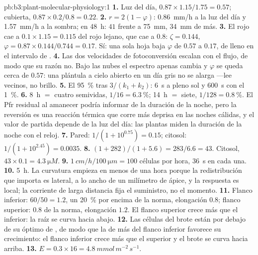\begin{solution}{pb:b3:plant-molecular-physiology:1}
\textbf{1.} Luz del día, $0.87\times 1.15/1.75 = 0.57$; cubierta, $0.87\times
0.2/0.8 = 0.22$.
\textbf{2.} $r = 2(1 - \varphi)$: \qty{0.86}{mm/h} a la luz del día y
\qty{1.57}{mm/h} a la sombra; en \qty{48}{h}: $41$ frente a
\qty{75}{mm}, \qty{34}{mm} de más.
\textbf{3.} El rojo cae a $0.1\times 1.15 = 0.115$ del rojo lejano, que
cae a $0.8$: $\zeta = 0.144$, $\varphi = 0.87\times 0.144/0.744 =
0.17$. Sí: una sola hoja baja $\varphi$ de $0.57$ a $0.17$, de lleno en
el intervalo de .
\textbf{4.} Las dos velocidades de fotoconversión escalan con el flujo,
de modo que su razón no. Bajo las nubes el espectro apenas cambia y
$\varphi$ se queda cerca de $0.57$: una plántula a cielo abierto en un
día gris no se alarga ---lee vecinos, no brillo.
\textbf{5.} El \qty{95}{\%} tras $3/(k_{1} + k_{2})$: \qty{6}{s} a pleno
sol y \qty{600}{s} con el \qty{1}{\%}.
\textbf{6.} \qty{8}{h} $=$ cuatro semividas, $1/16 = \qty{6.3}{\%}$;
\qty{14}{h} $=$ siete, $1/128 = \qty{0.8}{\%}$. El Pfr residual al
amanecer podría informar de la duración de la noche, pero la reversión
es una reacción térmica que corre más deprisa en las noches cálidas, y
el valor de partida depende de la luz del día: las plantas miden la
duración de la noche con el reloj.
\textbf{7.} Pared: $1/(1 + 10^{0.75}) = 0.15$; citosol: $1/(1 +
10^{2.45}) = 0.0035$.
\textbf{8.} $(1 + 282)/(1 + 5.6) = 283/6.6 = 43$. Citosol,
$43\times 0.1 = \qty{4.3}{\micro M}$.
\textbf{9.} $\qty{1}{cm/h}/\qty{100}{\micro m} = 100$ células por hora,
\qty{36}{s} en cada una.
\textbf{10.} \qty{5}{h}. La curvatura empieza en menos de una hora
porque la redistribución que importa es lateral, a lo ancho de un
milímetro de ápice, y la respuesta es local; la corriente de larga
distancia fija el suministro, no el momento.
\textbf{11.} Flanco inferior: $60/50 = 1.2$,  un \qty{20}{\%} por
encima de la norma, elongación $0.8$; flanco superior: $0.8$ de la
norma, elongación $1.2$. El flanco superior crece más que el inferior:
la raíz se curva hacia abajo.
\textbf{12.} Las células del brote están por debajo de su óptimo de
, de modo que la  de más del flanco inferior favorece su
crecimiento: el flanco inferior crece más que el superior y el brote se
curva hacia arriba.
\textbf{13.} $E = 0.3\times 16 = \qty{4.8}{mmol\,m^{-2}\,s^{-1}}$.

\end{solution}

